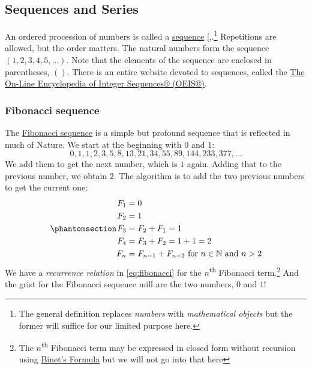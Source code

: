 \documentclass[
  a4paper,
]{article}
\begin{document}
\subsection{Sequences and Series}\label{sequences-and-series}

An ordered procession of numbers is called a
\href{https://en.wikipedia.org/w/index.php?title=Sequence&oldid=1177801065}{sequence}
{[},\citeproc{ref-wolframsequence}{5}{]}.\footnote{The
  general definition replaces \emph{numbers} with \emph{mathematical
  objects} but the former will suffice for our limited purpose here.}
Repetitions are allowed, but the order matters. The natural numbers form
the sequence \((1, 2, 3, 4, 5, \ldots)\). Note that the elements of the
sequence are enclosed in parentheses, \(()\). There is an entire website
devoted to sequences, called the \href{https://oeis.org/}{The On-Line
Encyclopedia of Integer Sequences® (OEIS®)}.

\subsubsection{Fibonacci sequence}\label{fibonacci-sequence}

The \href{https://en.wikipedia.org/wiki/Fibonacci_sequence}{Fibonacci
sequence} is a simple but profound sequence that is reflected in much of
Nature. We start at the beginning with \(0\) and \(1\): \[
0, 1, 1, 2, 3, 5, 8, 13, 21, 34, 55, 89, 144, 233, 377, \ldots
\] We add them to get the next number, which is \(1\) again. Adding that
to the previous number, we obtain \(2\). The algorithm is to add the two
previous numbers to get the current one:
\begin{equation}\phantomsection\label{eq:fibonacci}{
\begin{aligned}
F_{1} &= 0\\
F_{2} &= 1\\
F_{3} &= F_{2} + F_{1} = 1\\
F_{4} &= F_{3} + F_{2} = 1 + 1 = 2\\
F_{n} &= F_{n-1} + F_{n-2} \mbox{ for } n \in \mathbb{N} \mbox{ and } n > 2
\end{aligned}
}\end{equation} We have a \emph{recurrence relation} in
\cref{eq:fibonacci} for the \(n\)\textsuperscript{th} Fibonacci
term.\footnote{The \(n\)\textsuperscript{th} Fibonacci term may be
  expressed in closed form without recursion using
  \href{https://artofproblemsolving.com/wiki/index.php/Binet's_Formula}{Binet's
  Formula} but we will not go into that here} And the grist for the
Fibonacci sequence mill are the two numbers, \(0\) and \(1\)!
\end{document}
